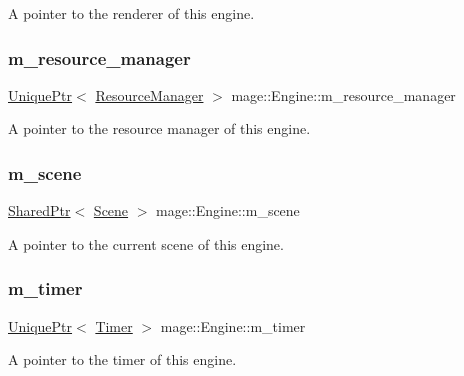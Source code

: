 A pointer to the renderer of this engine. \hypertarget{classmage_1_1_engine_ac8d94579e72983a99a78be6b9b606a28}{}\label{classmage_1_1_engine_ac8d94579e72983a99a78be6b9b606a28} 
\subsubsection{\texorpdfstring{m\+\_\+resource\+\_\+manager}{m\_resource\_manager}}
{\footnotesize\ttfamily \hyperlink{namespacemage_a8c307fbcc33bce9b7f2aa4c26c3b95cf}{Unique\+Ptr}$<$ \hyperlink{classmage_1_1_resource_manager}{Resource\+Manager} $>$ mage\+::\+Engine\+::m\+\_\+resource\+\_\+manager\hspace{0.3cm}{\ttfamily [private]}}

A pointer to the resource manager of this engine. \hypertarget{classmage_1_1_engine_a82158ab9c1b60538ef8c46d5eb263bb8}{}\label{classmage_1_1_engine_a82158ab9c1b60538ef8c46d5eb263bb8} 
\subsubsection{\texorpdfstring{m\+\_\+scene}{m\_scene}}
{\footnotesize\ttfamily \hyperlink{namespacemage_a1e01ae66713838a7a67d30e44c67703e}{Shared\+Ptr}$<$ \hyperlink{classmage_1_1_scene}{Scene} $>$ mage\+::\+Engine\+::m\+\_\+scene\hspace{0.3cm}{\ttfamily [private]}}

A pointer to the current scene of this engine. \hypertarget{classmage_1_1_engine_a4daac998928a6c087b310c52b3f26ae4}{}\label{classmage_1_1_engine_a4daac998928a6c087b310c52b3f26ae4} 
\subsubsection{\texorpdfstring{m\+\_\+timer}{m\_timer}}
{\footnotesize\ttfamily \hyperlink{namespacemage_a8c307fbcc33bce9b7f2aa4c26c3b95cf}{Unique\+Ptr}$<$ \hyperlink{classmage_1_1_timer}{Timer} $>$ mage\+::\+Engine\+::m\+\_\+timer\hspace{0.3cm}{\ttfamily [private]}}

A pointer to the timer of this engine. 